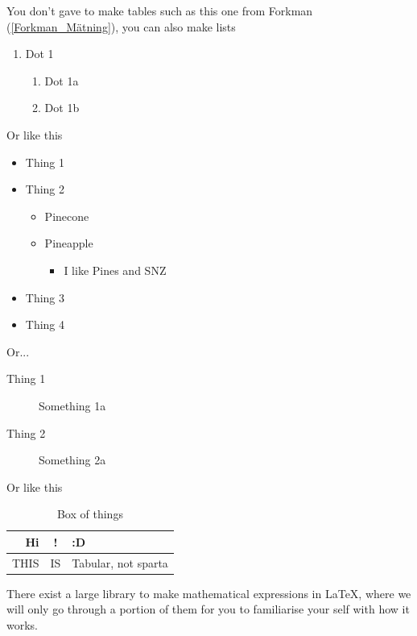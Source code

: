 You don't gave to make tables such as this one from Forkman (\ref{Forkman_Mätning}), you can also make lists

\begin{enumerate}
    \item Dot 1
    \begin{enumerate}
        \item Dot 1a
        \item Dot 1b
    \end{enumerate}
\end{enumerate}

Or like this

\begin{itemize}
    \item Thing 1
    \item Thing 2
    \begin{itemize}
        \item Pinecone
        \item Pineapple
        \begin{itemize}
            \item I like Pines and SNZ
        \end{itemize}
    \end{itemize}
    \item Thing 3
    \item Thing 4
\end{itemize}

Or...

\begin{description}
    \item[Thing 1] Something 1a
    \item[Thing 2] Something 2a
\end{description}

Or like this

\begin{table}[H]
    \centering
    \begin{tabular}{r|c|l}
        Hi & ! & :D \\
        \hline
        THIS & IS & Tabular, not sparta \\
    \end{tabular}
    \caption{Box of things}
    \label{Mina_lådor_av_streck}
\end{table}


There exist a large library to make mathematical expressions in \LaTeX{}, where we will only go through a portion of them for you to familiarise your self with how it works.

